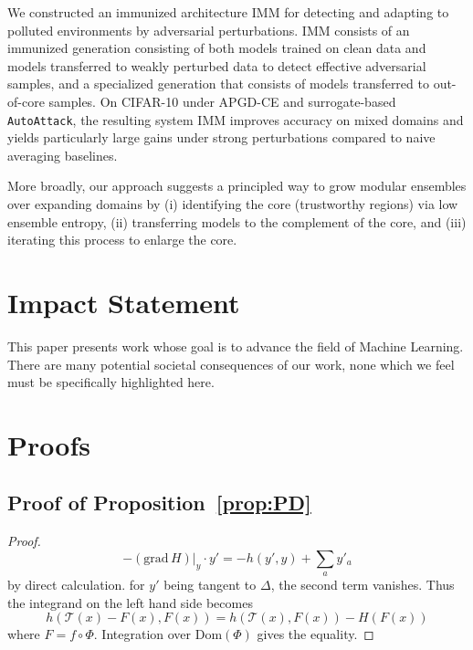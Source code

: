 \documentclass{article}
\theoremstyle{plain}
\theoremstyle{definition}
\theoremstyle{remark}
\newcommand{\cT}{\mathcal{T}}
\newcommand{\Dom}{\mathrm{Dom}}
\begin{document}
We constructed an immunized architecture IMM for detecting and adapting to polluted environments by adversarial perturbations. IMM consists of an immunized generation consisting of both models trained on clean data and models transferred to weakly perturbed data to detect effective adversarial samples, and a specialized generation that consists of models transferred to out-of-core samples. On CIFAR-10 under APGD-CE and surrogate-based \texttt{AutoAttack}, the resulting system IMM improves accuracy on mixed domains and yields particularly large gains under strong perturbations compared to naive averaging baselines.

More broadly, our approach suggests a principled way to grow modular ensembles over expanding domains by (i) identifying the core (trustworthy regions) via low ensemble entropy, (ii) transferring models to the complement of the core, and (iii) iterating this process to enlarge the core.


\section*{Impact Statement}

This paper presents work whose goal is to advance the field of Machine
Learning. There are many potential societal consequences of our work, none
which we feel must be specifically highlighted here.





\newpage
\appendix
\onecolumn

\section{Proofs}

\subsection{Proof of Proposition~\ref{prop:PD}}
\label{app:proof:prop:PD}
\begin{proof}
	$$-(\mathrm{grad}\, H)|_{y} \cdot y' = -h(y',y) + \sum_{a} y'_a $$
	by direct calculation. for $y'$ being tangent to $\Delta$, the second term vanishes. Thus the integrand on the left hand side becomes
	$$ h(\cT(x)-F(x),F(x)) = h(\cT(x),F(x)) - H(F(x))$$
	where $F = f \circ \Phi$.
	Integration over $\Dom(\Phi)$ gives the equality.
\end{proof}
\end{document}
